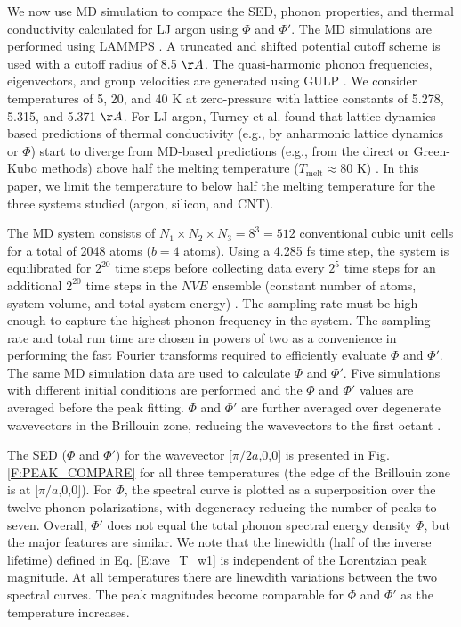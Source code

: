 \documentclass[12pt,twocolumn,iop]{/usr/share/texmf-texlive/tex/latex/iop/iopart}[/usr/share/texmf-texlive/tex/latex/iop/]
\begin{document}
We now use MD simulation to compare the SED, phonon properties, and thermal conductivity calculated for LJ argon using $\Phi$ and $\Phi'$. The MD simulations are performed using LAMMPS \cite{LAMMPS}. A truncated and shifted
potential cutoff scheme is used with a cutoff radius of 8.5 $\AA$. The quasi-harmonic phonon frequencies, eigenvectors, and group velocities are generated using GULP \cite{GULP}. We consider temperatures of 5, 20, and 40 K at zero-pressure with lattice constants of 5.278, 5.315, and 5.371 $\AA$. For LJ argon, Turney et al. found that lattice dynamics-based predictions of thermal conductivity (e.g., by anharmonic lattice dynamics or $\Phi$) start to diverge from MD-based predictions (e.g., from the direct or Green-Kubo methods) above half the melting temperature ($T_{\mathrm{melt}} \approx 80$ K) \cite{turney2009a}. In this paper, we limit the temperature to below half the melting temperature for the three systems studied (argon, silicon, and CNT).

The MD system consists of $N_1 \times N_2 \times N_3 = 8^3 = 512$ conventional cubic unit cells for a total of 2048 atoms ($b=4$ atoms). Using a 4.285 fs time step, the system is equilibrated for $2^{20}$ time steps before collecting data every $2^5$ time steps for an additional $2^{20}$ time steps in the $NVE$ ensemble (constant number of atoms, system volume, and total system energy) \cite{mcquarrie2000}. The sampling rate must be high enough to capture the highest phonon frequency in the system. The sampling rate and total run time are chosen in powers of two as a convenience in performing the fast Fourier transforms required to efficiently evaluate $\Phi$ and $\Phi'$. The same MD simulation data are used to calculate $\Phi$ and $\Phi'$.  Five simulations with different initial conditions are performed and the $\Phi$ and $\Phi'$ values are averaged before the peak fitting. $\Phi$ and $\Phi'$ are further averaged over degenerate wavevectors in the Brillouin zone, reducing the wavevectors to the first octant \cite{mcgaugheythesis}.

The SED ($\Phi$ and $\Phi'$) for the wavevector [$\pi/2a$,0,0] is presented in Fig$.$ \ref{F:PEAK_COMPARE} for all three temperatures (the edge of the Brillouin zone is at [$\pi/a$,0,0]).  For $\Phi$, the spectral curve is plotted as a superposition over the twelve phonon polarizations, with degeneracy reducing the number of peaks to seven.  Overall, $\Phi'$ does not equal the total phonon spectral energy density $\Phi$, but the major features are similar. We note that the linewidth (half of the inverse lifetime) defined in Eq$.$ \eqref{E:ave_T_w1} is independent of the Lorentzian peak magnitude. At all temperatures there are linewdith variations between the two spectral curves. The peak magnitudes become comparable for $\Phi$ and $\Phi'$ as the temperature increases.
\end{document}

